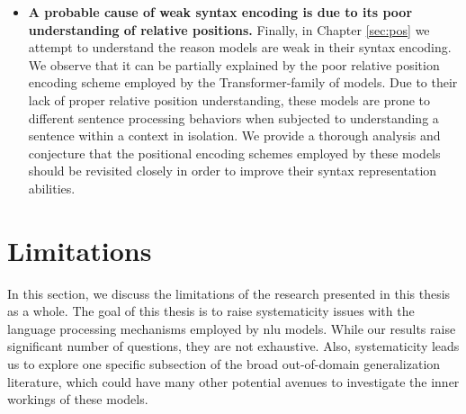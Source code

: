\documentclass[letterpaper, 12pt]{report}
\begin{document}
\begin{itemize}
  \item \textbf{A probable cause of weak syntax encoding is due to its poor understanding of relative positions.} Finally, in Chapter \autoref{sec:pos} we attempt to understand the reason models are weak in their syntax encoding. We observe that it can be partially explained by the poor relative position encoding scheme employed by the Transformer-family of models. Due to their lack of proper relative position understanding, these models are prone to different sentence processing behaviors when subjected to understanding a sentence within a context in isolation. We provide a thorough analysis and conjecture that the positional encoding schemes employed by these models should be revisited closely in order to improve their syntax representation abilities.

\end{itemize}

\section{Limitations}
\label{sec:conc_limits}

In this section, we discuss the limitations of the research presented in this thesis as a whole. The goal of this thesis is to raise systematicity issues with the language processing mechanisms employed by \acrshort{nlu} models. While our results raise significant number of questions, they are not exhaustive. Also, systematicity leads us to explore one specific subsection of the broad out-of-domain generalization literature, which could have many other potential avenues to investigate the inner workings of these models.
\end{document}
